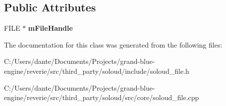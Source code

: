 \subsection*{Public Attributes}
\begin{DoxyCompactItemize}
\item 
\mbox{\label{class_so_loud_1_1_disk_file_a310c115f8d717792fc5c242095dc532d}} 
F\+I\+LE $\ast$ {\bfseries m\+File\+Handle}
\end{DoxyCompactItemize}


The documentation for this class was generated from the following files\+:\begin{DoxyCompactItemize}
\item 
C\+:/\+Users/dante/\+Documents/\+Projects/grand-\/blue-\/engine/reverie/src/third\+\_\+party/soloud/include/soloud\+\_\+file.\+h\item 
C\+:/\+Users/dante/\+Documents/\+Projects/grand-\/blue-\/engine/reverie/src/third\+\_\+party/soloud/src/core/soloud\+\_\+file.\+cpp\end{DoxyCompactItemize}
